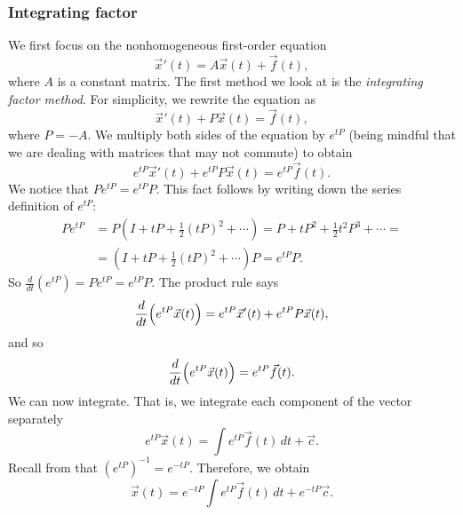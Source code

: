 \subsubsection{Integrating factor}

We first focus on the nonhomogeneous first-order equation
\begin{equation*}
{\vec{x}}'(t) = A\vec{x}(t) + \vec{f}(t) ,
\end{equation*}
where $A$ is a constant matrix.  The first method we look at is the
\emph{integrating factor method}.
For simplicity, we rewrite the equation as
\begin{equation*}
{\vec{x}}'(t) + P \vec{x}(t) = \vec{f}(t) ,
\end{equation*}
where $P = -A$.
We multiply both sides of the
equation by $e^{tP}$ (being mindful that we are dealing with matrices that
may not commute) to obtain
\begin{equation*}
e^{tP}{\vec{x}}'(t) + e^{tP}P\vec{x}(t) = e^{tP}\vec{f}(t) .
\end{equation*}
We notice that $P e^{tP} = e^{tP} P$.  This fact follows by writing
down the series definition of $e^{tP}$:
\begin{equation*}
\begin{split}
P e^{tP} & = 
P \left(
I + tP + \frac{1}{2} {(tP)}^2 + \cdots \right)
=
P + tP^2 + \frac{1}{2} t^2P^3 + \cdots
=
\\
& =
\left(
I + tP + \frac{1}{2} {(tP)}^2 + \cdots \right) P 
= e^{tP} P . 
\end{split}
\end{equation*}
So $\frac{d}{dt} \left( e^{tP} \right) = P e^{tP} = e^{tP} P$.  The product
rule says
\begin{equation*}
\frac{d}{dt}
\Bigl( e^{tP} \vec{x}(t) \Bigr) =
e^{tP}{\vec{x}}'(t) + e^{tP}P\vec{x}(t),
\end{equation*}
and so
\begin{equation*}
\frac{d}{dt}
\Bigl( e^{tP} \vec{x}(t) \Bigr) = e^{tP}\vec{f}(t) .
\end{equation*}
We can now integrate.  That is, we integrate each component of the vector
separately
\begin{equation*}
e^{tP} \vec{x}(t) = \int e^{tP}\vec{f}(t) \, dt + \vec{c} .
\end{equation*}
Recall from  that ${(e^{tP})}^{-1} = e^{-tP}$.
Therefore, we obtain
\begin{equation*}
\vec{x}(t) = e^{-tP} \int e^{tP}\vec{f}(t) \, dt + e^{-tP} \vec{c} .
\end{equation*}

